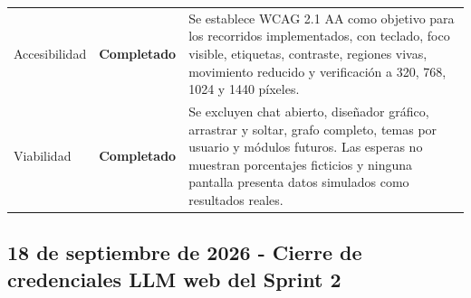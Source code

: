 \documentclass[11pt,letterpaper]{article}
\newcommand{\statusok}{\textcolor{deepgreen}{\textbf{Completado}}}
\begin{document}
\begin{longtable}{@{}p{}p{}p{}@{}}
  Accesibilidad & \statusok & Se establece WCAG 2.1 AA como objetivo para los recorridos implementados, con teclado, foco visible, etiquetas, contraste, regiones vivas, movimiento reducido y verificación a 320, 768, 1024 y 1440 píxeles. \\
  Viabilidad & \statusok & Se excluyen chat abierto, diseñador gráfico, arrastrar y soltar, grafo completo, temas por usuario y módulos futuros. Las esperas no muestran porcentajes ficticios y ninguna pantalla presenta datos simulados como resultados reales. \\
  \bottomrule
\end{longtable}

\clearpage
\subsection{18 de septiembre de 2026 - Cierre de credenciales LLM web del Sprint 2}
\end{document}
